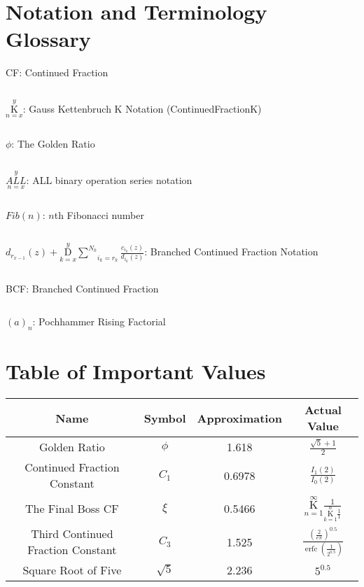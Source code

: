\documentclass{article}
\DeclareMathOperator\comperrorfunc{erfc}
\begin{document}
\section{Notation and Terminology Glossary}

CF: Continued Fraction

$${}$$

$\underset{n=x}{\overset{y}{ \mathrm K}}$: Gauss Kettenbruch K Notation (ContinuedFractionK)

$${}$$

$\phi$: The Golden Ratio

$${}$$

$\underset{n=x}{\overset{y}{ ALL }}$: ALL binary operation series notation

$${}$$

$Fib(n)$: $n$th Fibonacci number

$${}$$

$d_{r_{x-1}}(z) + \underset{k=x}{\overset{y}{ \mathrm D}} \underset{i_k=r_k}{\overset{N_k}{ \sum}} \frac{c_{i_k} (z)}{d_{i_k} (z)}$: Branched Continued Fraction Notation

$${}$$

BCF: Branched Continued Fraction

$${}$$

$(a)_n$: Pochhammer Rising Factorial

\section{Table of Important Values}

\begin{center}
\begin{tabular}{||c c c c||} 
 \hline
 Name & Symbol & Approximation & Actual Value \\ [0.5ex] 
 \hline\hline
 Golden Ratio & $\phi$ & 1.618 & $\frac{\sqrt{5}+1}{2}$ \\ 
 \hline
 Continued Fraction Constant & $C_1$ & 0.6978 & $\frac{I_1(2)}{I_0(2)}$ \\
 \hline
 The Final Boss CF & $\xi$ & 0.5466 &  $\underset{n=1}{\overset{\infty}{ \mathrm K}} \frac{1}{ \underset{k=1}{\overset{n}{ \mathrm K}} \frac{1}{1} } $\\
 \hline
 Third Continued Fraction Constant & $C_3$ & 1.525 &  $\frac{(\frac{2}{e\pi})^{0.5}}{\comperrorfunc(\frac{1}{2^{0.5}})}$\\
 \hline
 Square Root of Five & $\sqrt{5}$ & 2.236 & $5^{0.5}$ \\ [1ex] 
 \hline
\end{tabular}
\end{center}
\end{document}
